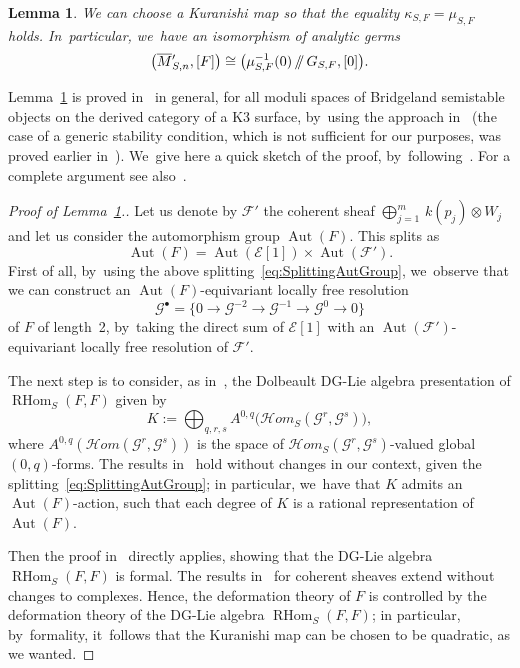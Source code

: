 \documentclass[JEP,XML,SOM,Unicode,published]{cedram}
\providecommand\sslash{\mathop{/\mkern-5.5mu/}}
\newcommand{\sbullet}{{\scriptscriptstyle\bullet}}
\newcommand\cE{\mathcal{E}}
\newcommand\cF{\mathcal{F}}
\newcommand\cG{\mathcal{G}}
\DeclareMathOperator{\Aut}{Aut}
\DeclareMathOperator{\RHom}{RHom}
\newtheorem{lemm}{Lemma}[section]
\theoremstyle{definition}
\begin{document}
\begin{lemm}\label{lem:KuranishiK3}
We can choose a Kuranishi map so that the equality $\kappa_{S,F}=\mu_{S,F}$ holds. In~particular, we~have an isomorphism of analytic germs
\[
\left(\overline{M}{}_{S,n}',[F]\right)\cong \bigl(\mu_{S,F}^{-1}(0)\sslash G_{S,F},[0]\bigr).
\]
\end{lemm}

Lemma~\ref{lem:KuranishiK3} is proved in~\cite[\S 3.2]{PZ:FormalityBridgeland} in general, for all moduli spaces of Bridgeland semistable objects on the derived category of a K3 surface, by~using the approach in~\cite{BMM:Formality} (the case of a generic stability condition, which is not sufficient for our purposes, was proved earlier in~\cite{BZ:Kuranishi}). We~give here a quick sketch of the proof, by~following~\cite{PZ:FormalityBridgeland}. For a complete argument see also~\cite[Th.\,3.2]{AS:Formality}.

\begin{proof}[Proof of Lemma~\ref{lem:KuranishiK3}.]
Let us denote by $\cF'$ the coherent sheaf $\bigoplus_{j=1}^m\, k(p_j)\otimes W_j$ and let us consider the automorphism group $\Aut(F)$.
This splits as
\begin{equation}\label{eq:SplittingAutGroup}
\Aut(F) = \Aut(\cE[1]) \times \Aut(\cF').
\end{equation}
First of all, by~using the above splitting~\eqref{eq:SplittingAutGroup}, we~observe that we can construct an $\Aut(F)$-equivariant locally free resolution
\[
\cG^\sbullet=\{0\to \cG^{-2} \to \cG^{-1} \to \cG^0 \to 0 \}
\]
of $F$ of length~2, by~taking the direct sum of $\cE[1]$ with an $\Aut(\cF')$-equivariant locally free resolution of $\cF'$.

The next step is to consider, as in~\cite[\S 5]{BMM:Formality}, the Dolbeault DG-Lie algebra presentation of $\RHom_S(F,F)$ given by
\[
K:=\bigoplus_{q,r,s} A^{0,q}\bigl(\mathcal{H}om_S(\cG^r,\cG^s) \bigr),
\]
where $A^{0,q}(\mathcal{H}om(\cG^r,\cG^s))$ is the space of $\mathcal{H}om_S(\cG^r,\cG^s)$-valued global $(0,q)$-forms.
The results in~\cite[\S 3]{BMM:Quadraticity} hold without changes in our context, given the splitting~\eqref{eq:SplittingAutGroup}; in particular, we~have that $K$ admits an $\Aut(F)$-action, such that each degree of $K$ is a rational representation of $\Aut(F)$.

Then the proof in~\cite[Th.\,5.1]{BMM:Formality} directly applies, showing that the DG-Lie algebra $\RHom_S(F,F)$ is formal.
The results in~\cite{FIM:dgla} for coherent sheaves extend without changes to complexes. Hence, the deformation theory of $F$ is controlled by the deformation theory of the DG-Lie algebra $\RHom_S(F,F)$; in particular, by~formality, it~follows that the Kuranishi map can be chosen to be quadratic, as we wanted.
\end{proof}
\end{document}

